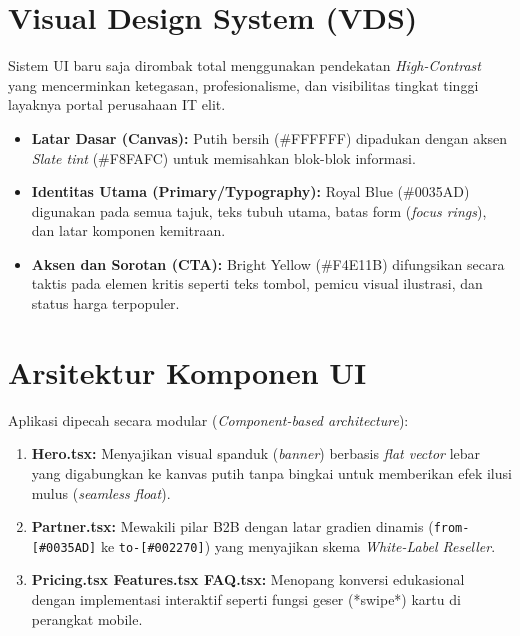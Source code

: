 \documentclass[12pt,a4paper]{article}
\begin{document}
\section{Visual Design System (VDS)}
Sistem UI baru saja dirombak total menggunakan pendekatan \textit{High-Contrast} yang mencerminkan ketegasan, profesionalisme, dan visibilitas tingkat tinggi layaknya portal perusahaan IT elit.
\begin{itemize}
    \item \textbf{Latar Dasar (Canvas):} Putih bersih (\#FFFFFF) dipadukan dengan aksen \textit{Slate tint} (\#F8FAFC) untuk memisahkan blok-blok informasi.
    \item \textbf{Identitas Utama (Primary/Typography):} Royal Blue (\#0035AD) digunakan pada semua tajuk, teks tubuh utama, batas form (\textit{focus rings}), dan latar komponen kemitraan.
    \item \textbf{Aksen dan Sorotan (CTA):} Bright Yellow (\#F4E11B) difungsikan secara taktis pada elemen kritis seperti teks tombol, pemicu visual ilustrasi, dan status harga terpopuler.
\end{itemize}

\section{Arsitektur Komponen UI}
Aplikasi dipecah secara modular (\textit{Component-based architecture}):
\begin{enumerate}
    \item \textbf{Hero.tsx:} Menyajikan visual spanduk (\textit{banner}) berbasis \textit{flat vector} lebar yang digabungkan ke kanvas putih tanpa bingkai untuk memberikan efek ilusi mulus (\textit{seamless float}).
    \item \textbf{Partner.tsx:} Mewakili pilar B2B dengan latar gradien dinamis (\texttt{from-[\#0035AD]} ke \texttt{to-[\#002270]}) yang menyajikan skema \textit{White-Label Reseller}.
    \item \textbf{Pricing.tsx \textendash{} Features.tsx \textendash{} FAQ.tsx:} Menopang konversi edukasional dengan implementasi interaktif seperti fungsi geser (*swipe*) kartu di perangkat mobile.
\end{enumerate}
\end{document}
